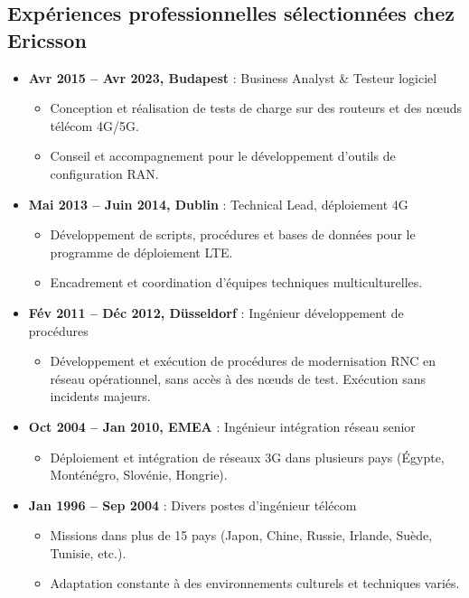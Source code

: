 \documentclass[a4paper,10pt]{article}
\begin{document}
\subsection*{Expériences professionnelles sélectionnées chez Ericsson}
\begin{itemize}
    \item \textbf{Avr 2015 -- Avr 2023, Budapest} : Business Analyst \& Testeur logiciel
    \begin{itemize}
        \item Conception et réalisation de tests de charge sur des routeurs et des nœuds télécom 4G/5G.
        \item Conseil et accompagnement pour le développement d'outils de configuration RAN.
    \end{itemize}
    \item \textbf{Mai 2013 -- Juin 2014, Dublin} : Technical Lead, déploiement 4G
    \begin{itemize}
        \item Développement de scripts, procédures et bases de données pour le programme de déploiement LTE.
        \item Encadrement et coordination d'équipes techniques multiculturelles.
    \end{itemize}
    \item \textbf{Fév 2011 -- Déc 2012, Düsseldorf} : Ingénieur développement de procédures
    \begin{itemize}
        \item Développement et exécution de procédures de modernisation RNC en réseau opérationnel, sans accès à des nœuds de test. Exécution sans incidents majeurs.
    \end{itemize}
    \item \textbf{Oct 2004 -- Jan 2010, EMEA} : Ingénieur intégration réseau senior
    \begin{itemize}
        \item Déploiement et intégration de réseaux 3G dans plusieurs pays (Égypte, Monténégro, Slovénie, Hongrie).
    \end{itemize}
    \item \textbf{Jan 1996 -- Sep 2004} : Divers postes d'ingénieur télécom
    \begin{itemize}
        \item Missions dans plus de 15 pays (Japon, Chine, Russie, Irlande, Suède, Tunisie, etc.).
        \item Adaptation constante à des environnements culturels et techniques variés.
    \end{itemize}
\end{itemize}
\end{document}

